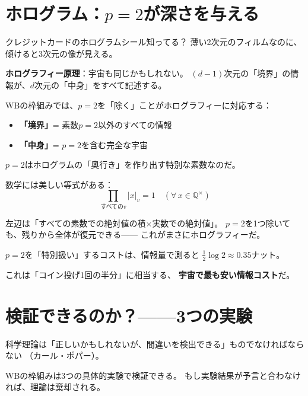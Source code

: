 \documentclass[12pt,a4paper]{article}
\begin{document}
\section{ホログラム：$p=2$が深さを与える}

\begin{analogybox}[ホログラムカードのアナロジー]
クレジットカードのホログラムシール知ってる？
薄い2次元のフィルムなのに、傾けると3次元の像が見える。

\textbf{ホログラフィー原理}：宇宙も同じかもしれない。
$(d-1)$次元の「境界」の情報が、$d$次元の「中身」をすべて記述する。

WBの枠組みでは、$p=2$を「除く」ことがホログラフィーに対応する：
\begin{itemize}
\item \textbf{「境界」}= 素数$p=2$以外のすべての情報
\item \textbf{「中身」}= $p=2$を含む完全な宇宙
\end{itemize}

$p=2$はホログラムの「奥行き」を作り出す特別な素数なのだ。
\end{analogybox}

\begin{mathbox}[アデール積公式]
数学には美しい等式がある：
\[
  \prod_{\text{すべての}v}|x|_v = 1 \quad (\forall\, x \in \mathbb{Q}^\times)
\]

左辺は「すべての素数での絶対値の積$\times$実数での絶対値」。
$p=2$を1つ除いても、残りから全体が復元できる——
これがまさにホログラフィーだ。
\end{mathbox}

\begin{funbox}[情報コスト：$\Delta S = \frac{1}{2}\log 2$]
$p=2$を「特別扱い」するコストは、情報量で測ると
$\frac{1}{2}\log 2 \approx 0.35$ナット。

これは「コイン投げ1回の半分」に相当する、
\textbf{宇宙で最も安い情報コスト}だ。
\end{funbox}

\section{検証できるのか？——3つの実験}

\begin{testbox}
科学理論は「正しいかもしれないが、間違いを検出できる」ものでなければならない
（カール・ポパー）。

WBの枠組みは3つの具体的実験で検証できる。
もし実験結果が予言と合わなければ、理論は棄却される。
\end{testbox}
\end{document}
